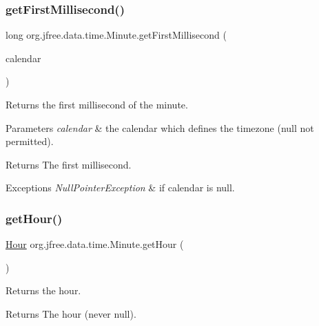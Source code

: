 \subsubsection{\texorpdfstring{get\+First\+Millisecond()}{getFirstMillisecond()}\hspace{0.1cm}{\footnotesize\ttfamily [2/2]}}
{\footnotesize\ttfamily long org.\+jfree.\+data.\+time.\+Minute.\+get\+First\+Millisecond (\begin{DoxyParamCaption}\item[{Calendar}]{calendar }\end{DoxyParamCaption})}

Returns the first millisecond of the minute.


\begin{DoxyParams}{Parameters}
{\em calendar} & the calendar which defines the timezone ({\ttfamily null} not permitted).\\
\hline
\end{DoxyParams}
\begin{DoxyReturn}{Returns}
The first millisecond.
\end{DoxyReturn}

\begin{DoxyExceptions}{Exceptions}
{\em Null\+Pointer\+Exception} & if {\ttfamily calendar} is {\ttfamily null}. \\
\hline
\end{DoxyExceptions}
\mbox{\label{classorg_1_1jfree_1_1data_1_1time_1_1_minute_ae10e6cf4add002f4df3aa78258dd3c0b}} 
\subsubsection{\texorpdfstring{get\+Hour()}{getHour()}}
{\footnotesize\ttfamily \mbox{\hyperlink{classorg_1_1jfree_1_1data_1_1time_1_1_hour}{Hour}} org.\+jfree.\+data.\+time.\+Minute.\+get\+Hour (\begin{DoxyParamCaption}{ }\end{DoxyParamCaption})}

Returns the hour.

\begin{DoxyReturn}{Returns}
The hour (never {\ttfamily null}). 
\end{DoxyReturn}
\mbox{\label{classorg_1_1jfree_1_1data_1_1time_1_1_minute_a913369856992923eac6f954ac19c6b95}} 
